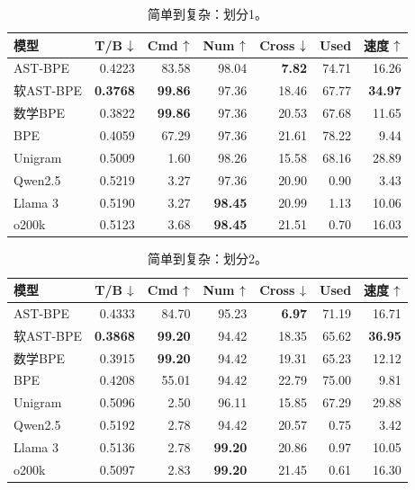 \begin{table}[H]
\centering\small\renewcommand{\arraystretch}{1.05}
\caption{简单到复杂：划分1。}\label{tab:detail9}
\begin{tabular}{lrrrrrr}\toprule
模型&T/B $\downarrow$&Cmd $\uparrow$&Num $\uparrow$&Cross $\downarrow$&Used&速度 $\uparrow$\\\midrule
AST-BPE & 0.4223 & 83.58 & 98.04 & \textbf{7.82} & 74.71 & 16.26 \\
软AST-BPE & \textbf{0.3768} & \textbf{99.86} & 97.36 & 18.46 & 67.77 & \textbf{34.97} \\
数学BPE & 0.3822 & \textbf{99.86} & 97.36 & 20.53 & 67.68 & 11.65 \\
BPE & 0.4059 & 67.29 & 97.36 & 21.61 & 78.22 & 9.44 \\
Unigram & 0.5009 & 1.60 & 98.26 & 15.58 & 68.16 & 28.89 \\
\midrule
Qwen2.5 & 0.5219 & 3.27 & 97.36 & 20.90 & 0.90 & 3.43 \\
Llama 3 & 0.5190 & 3.27 & \textbf{98.45} & 20.99 & 1.13 & 10.06 \\
o200k & 0.5123 & 3.68 & \textbf{98.45} & 21.51 & 0.70 & 16.03 \\
\bottomrule\end{tabular}
\end{table}

\begin{table}[H]
\centering\small\renewcommand{\arraystretch}{1.05}
\caption{简单到复杂：划分2。}\label{tab:detail10}
\begin{tabular}{lrrrrrr}\toprule
模型&T/B $\downarrow$&Cmd $\uparrow$&Num $\uparrow$&Cross $\downarrow$&Used&速度 $\uparrow$\\\midrule
AST-BPE & 0.4333 & 84.70 & 95.23 & \textbf{6.97} & 71.19 & 16.71 \\
软AST-BPE & \textbf{0.3868} & \textbf{99.20} & 94.42 & 18.35 & 65.62 & \textbf{36.95} \\
数学BPE & 0.3915 & \textbf{99.20} & 94.42 & 19.31 & 65.23 & 12.12 \\
BPE & 0.4208 & 55.01 & 94.42 & 22.79 & 75.00 & 9.81 \\
Unigram & 0.5096 & 2.50 & 96.11 & 15.85 & 67.29 & 29.88 \\
\midrule
Qwen2.5 & 0.5192 & 2.78 & 94.42 & 20.57 & 0.75 & 3.42 \\
Llama 3 & 0.5136 & 2.78 & \textbf{99.20} & 20.86 & 0.97 & 10.05 \\
o200k & 0.5097 & 2.83 & \textbf{99.20} & 21.45 & 0.61 & 16.30 \\
\bottomrule\end{tabular}
\end{table}

